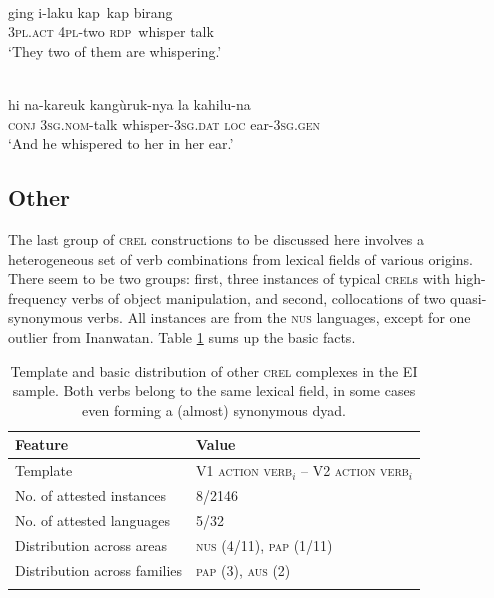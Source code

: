 \ea \label{WesternPantar030}
\\
\gll ging i-laku kap~kap birang \\
\textsc{3}\textsc{pl}.\textsc{act} \textsc{4}\textsc{pl}-two \textsc{rdp}~whisper talk \\
\glft `They two of them are whispering.'\\ 
\z

\ea \label{Kambera004}
\\
\gll hi na-kareuk kangùruk-nya la kahilu-na \\
\textsc{conj} \textsc{3}\textsc{sg}.\textsc{nom}-talk whisper-\textsc{3}\textsc{sg}.\textsc{dat} \textsc{loc} ear-\textsc{3}\textsc{sg}.\textsc{gen} \\
\glft `And he whispered to her in her ear.'\\ 
\z

\subsection{Other} \label{sec:other}
The last group of \textsc{crel} constructions to be discussed here involves a heterogeneous set of verb combinations from lexical fields of various origins. There seem to be two groups: first, three instances of typical \textsc{crel}s with high-frequency verbs of object manipulation, and second, collocations of two quasi-synonymous verbs. All instances are from the \textsc{nus} languages, except for one outlier from Inanwatan. Table \ref{table:basiccrelother} sums up the basic facts.

\begin{table}
\begin{tabular}{ll}
\lsptoprule
Feature&Value\tabularnewline
\hline
Template&V1 \textsc{action verb}$_{i}$ -- V2 \textsc{action verb}$_{i}$\tabularnewline
No. of attested instances& 8/2146 \tabularnewline
No. of attested languages& 5/32 \tabularnewline
Distribution across areas& \textsc{nus} (4/11), \textsc{pap} (1/11) \tabularnewline
Distribution across families& \textsc{pap} (3), \textsc{aus} (2) \tabularnewline
\lspbottomrule
\end{tabular}
\caption[Template and basic distribution of other \textsc{crel} complexes]{Template and basic distribution of other \textsc{crel} complexes in the EI sample. Both verbs belong to the same lexical field, in some cases even forming a (almost) synonymous dyad.}
\label{table:basiccrelother}
\end{table}

